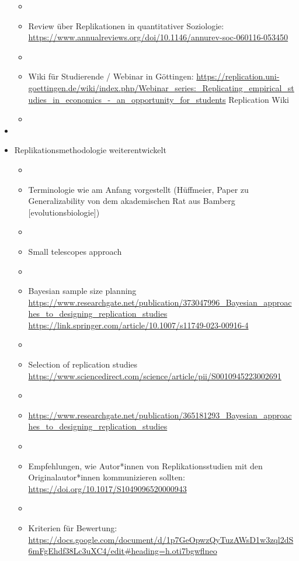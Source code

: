 \documentclass[
  letterpaper,
  DIV=11,
  numbers=noendperiod]{scrreprt}
\begin{document}
\begin{itemize}
  \begin{itemize}
  \item
  \item
    Review über Replikationen in quantitativer Soziologie:
    \url{https://www.annualreviews.org/doi/10.1146/annurev-soc-060116-053450}
  \item
  \item
    Wiki für Studierende / Webinar in Göttingen:
    \url{https://replication.uni-goettingen.de/wiki/index.php/Webinar_series:_Replicating_empirical_studies_in_economics_-_an_opportunity_for_students}
    Replication Wiki
  \item
  \end{itemize}
\item
\item
  Replikationsmethodologie weiterentwickelt

  \begin{itemize}
  \item
  \item
    Terminologie wie am Anfang vorgestellt (Hüffmeier, Paper zu
    Generalizability von dem akademischen Rat aus Bamberg
    {[}evolutionsbiologie{]})
  \item
  \item
    Small telescopes approach
  \item
  \item
    Bayesian sample size planning
    \url{https://www.researchgate.net/publication/373047996_Bayesian_approaches_to_designing_replication_studies}\\
    \url{https://link.springer.com/article/10.1007/s11749-023-00916-4}
  \item
  \item
    Selection of replication studies
    \url{https://www.sciencedirect.com/science/article/pii/S0010945223002691}
  \item
  \item
    \url{https://www.researchgate.net/publication/365181293_Bayesian_approaches_to_designing_replication_studies}
  \item
  \item
    Empfehlungen, wie Autor*innen von Replikationsstudien mit den
    Originalautor*innen kommunizieren sollten:
    \url{https://doi.org/10.1017/S1049096520000943}
  \item
  \item
    Kriterien für Bewertung:
    \url{https://docs.google.com/document/d/1p7GeOpwzQyTuzAWsD1w3zql2dS6mFgEhdf38Lc3uXC4/edit\#heading=h.oti7bgwflneo}


\end{itemize}
\end{itemize}
\end{document}
